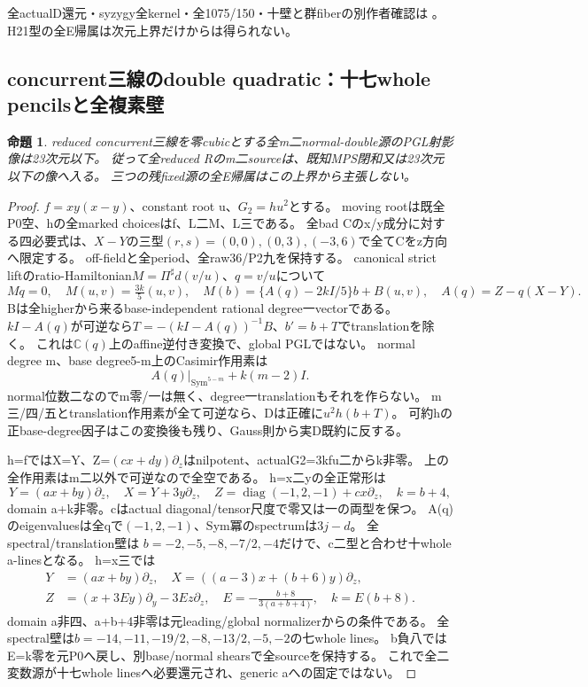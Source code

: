 \documentclass[a4paper,11pt]{ltjsarticle}
\newtheorem{proposition}{命題}[section]
\theoremstyle{definition}
\begin{document}
全actualD還元・syzygy全kernel・全1075/150・十壁と群fiberの別作者確認は
。
H21型の全E帰属は次元上界だけからは得られない。

\subsection{concurrent三線のdouble quadratic：十七whole pencilsと全複素壁}
\begin{proposition}\label{prop:plane-m2-concurrent-double-all-G}
reduced concurrent三線を零cubicとする全m二normal-double源のPGL射影像は23次元以下。
従って全reduced Rのm二sourceは、既知MPS閉和又は23次元以下の像へ入る。
三つの残fixed源の全E帰属はこの上界から主張しない。
\end{proposition}
\begin{proof}
$f=xy(x-y)$、constant root u、$G_2=h u^2$とする。
moving rootは既全P0空、hの全marked choicesはf、L二M、L三である。
全bad Cのx/y成分に対する四必要式は、$X-Y$の三型$(r,s)=(0,0),(0,3),(-3,6)$で全てCをz方向へ限定する。
off-fieldと全period、全raw36/P2九を保持する。
canonical strict liftのratio-Hamiltonian$M=\Pi^\sharp d(v/u)$、$q=v/u$について
\[
 Mq=0,\quad M(u,v)=\tfrac{3k}{5}(u,v),\quad
 M(b)=\{A(q)-2kI/5\}b+B(u,v),\quad A(q)=Z-q(X-Y).
\]
Bは全higherから来るbase-independent rational degree一vectorである。
$kI-A(q)$が可逆なら$T=-(kI-A(q))^{-1}B$、$b'=b+T$でtranslationを除く。
これは$\mathbb C(q)$上のaffine逆付き変換で、global PGLではない。
normal degree m、base degree5-m上のCasimir作用素は
\[
 A(q)|_{\operatorname{Sym}^{5-m}}+k(m-2)I.
\]
normal位数二なのでm零/一は無く、degree一translationもそれを作らない。
m三/四/五とtranslation作用素が全て可逆なら、Dは正確に$u^2h(b+T)$。
可約hの正base-degree因子はこの変換後も残り、Gauss則から実D既約に反する。

h=fではX=Y、Z=$(cx+dy)\partial_z$はnilpotent、actualG2=3kfu二からk非零。
上の全作用素はm二以外で可逆なので全空である。
h=x二yの全正常形は
\[
 Y=(ax+by)\partial_z,\quad X=Y+3y\partial_z,\quad
 Z=\operatorname{diag}(-1,2,-1)+cx\partial_z,\quad k=b+4,
\]
domain a+k非零。cはactual diagonal/tensor尺度で零又は一の両型を保つ。
A(q)のeigenvaluesは全qで$(-1,2,-1)$、Sym冪のspectrumは$3j-d$。
全spectral/translation壁は
$b=-2,-5,-8,-7/2,-4$だけで、c二型と合わせ十whole a-linesとなる。
h=x三では
\[
\begin{split}
 Y&=(ax+by)\partial_z,\quad X=((a-3)x+(b+6)y)\partial_z,\\
 Z&=(x+3Ey)\partial_y-3Ez\partial_z,\quad
 E=-\frac{b+8}{3(a+b+4)},\quad k=E(b+8).
\end{split}
\]
domain a非四、a+b+4非零は元leading/global normalizerからの条件である。
全spectral壁は$b=-14,-11,-19/2,-8,-13/2,-5,-2$の七whole lines。
b負八ではE=k零を元P0へ戻し、別base/normal shearsで全sourceを保持する。
これで全二変数源が十七whole linesへ必要還元され、generic aへの固定ではない。


\end{proof}
\end{document}
